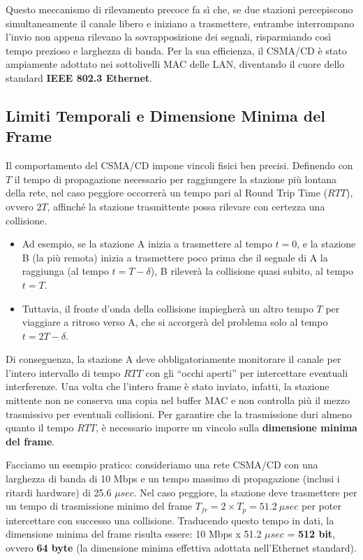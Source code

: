 \documentclass[
  italian,
  openany]{book}
\begin{document}
Questo meccanismo di rilevamento precoce fa sì che, se due stazioni
percepiscono simultaneamente il canale libero e iniziano a trasmettere,
entrambe interrompano l'invio non appena rilevano la sovrapposizione dei
segnali, risparmiando così tempo prezioso e larghezza di banda. Per la
sua efficienza, il CSMA/CD è stato ampiamente adottato nei sottolivelli
MAC delle LAN, diventando il cuore dello standard \textbf{IEEE 802.3
Ethernet}.

\subsection{Limiti Temporali e Dimensione Minima del
Frame}\label{limiti-temporali-e-dimensione-minima-del-frame}

Il comportamento del CSMA/CD impone vincoli fisici ben precisi.
Definendo con \(T\) il tempo di propagazione necessario per raggiungere
la stazione più lontana della rete, nel caso peggiore occorrerà un tempo
pari al Round Trip Time (\(RTT\)), ovvero \(2T\), affinché la stazione
trasmittente possa rilevare con certezza una collisione.

\begin{itemize}
\item
  Ad esempio, se la stazione A inizia a trasmettere al tempo \(t=0\), e
  la stazione B (la più remota) inizia a trasmettere poco prima che il
  segnale di A la raggiunga (al tempo \(t=T-\delta\)), B rileverà la
  collisione quasi subito, al tempo \(t=T\).
\item
  Tuttavia, il fronte d'onda della collisione impiegherà un altro tempo
  \(T\) per viaggiare a ritroso verso A, che si accorgerà del problema
  solo al tempo \(t=2T-\delta\).
\end{itemize}

Di conseguenza, la stazione A deve obbligatoriamente monitorare il
canale per l'intero intervallo di tempo \(RTT\) con gli ``occhi aperti''
per intercettare eventuali interferenze. Una volta che l'intero frame è
stato inviato, infatti, la stazione mittente non ne conserva una copia
nel buffer MAC e non controlla più il mezzo trasmissivo per eventuali
collisioni. Per garantire che la trasmissione duri almeno quanto il
tempo \(RTT\), è necessario imporre un vincolo sulla \textbf{dimensione
minima del frame}.

Facciamo un esempio pratico: consideriamo una rete CSMA/CD con una
larghezza di banda di 10 Mbps e un tempo massimo di propagazione
(inclusi i ritardi hardware) di 25.6 \(\mu sec\). Nel caso peggiore, la
stazione deve trasmettere per un tempo di trasmissione minimo del frame
\(T_{fr} = 2 \times T_{p} = 51.2~\mu sec\) per poter intercettare con
successo una collisione. Traducendo questo tempo in dati, la dimensione
minima del frame risulta essere: 10 Mbps x 51.2 \(\mu sec\) =
\textbf{512 bit}, ovvero \textbf{64 byte} (la dimensione minima
effettiva adottata nell'Ethernet standard).
\end{document}
